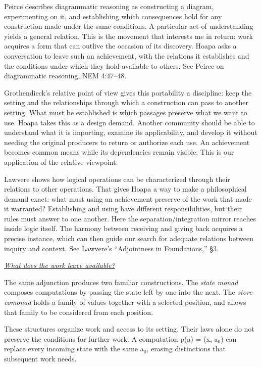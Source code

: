 \documentclass[a4paper,10pt]{article}
\newcommand{\subhead}[1]{\par\addvspace{4pt}\noindent\underline{\emph{#1}}\par\nopagebreak}
\newcommand{\marked}[1]{\par\addvspace{2pt}{\bfseries #1}\par\nopagebreak}
\renewenvironment{leftbar}{%
  \def\FrameCommand{{\color{black!30}\vrule width 1.2pt}\hspace{6pt}}%
  \MakeFramed{\advance\hsize-\width \FrameRestore}}{\endMakeFramed}
\newenvironment{commentary}{\par\vspace{-2pt}\begin{leftbar}\color{black!80}}{\end{leftbar}}
\begin{document}
\begin{commentary}
\marked{\textcolor{returnroyal}{Return}}
Peirce describes diagrammatic reasoning as constructing a diagram, experimenting on it, and establishing which consequences hold for any construction made under the same conditions. A particular act of understanding yields a general relation. This is the movement that interests me in return: work acquires a form that can outlive the occasion of its discovery. Hoapa asks a conversation to leave such an achievement, with the relations it establishes and the conditions under which they hold available to others. See Peirce on diagrammatic reasoning, NEM 4:47–48.\par
\marked{\textcolor{replayolive}{Replay}}
Grothendieck's relative point of view gives this portability a discipline: keep the setting and the relationships through which a construction can pass to another setting. What must be established is which passages preserve what we want to use. Hoapa takes this as a design demand. Another community should be able to understand what it is importing, examine its applicability, and develop it without needing the original producers to return or authorize each use. An achievement becomes common means while its dependencies remain visible. This is our application of the relative viewpoint.\par
\marked{\textcolor{harmonyorchid}{Harmony}}
Lawvere shows how logical operations can be characterized through their relations to other operations. That gives Hoapa a way to make a philosophical demand exact: what must using an achievement preserve of the work that made it warranted? Establishing and using have different responsibilities, but their rules must answer to one another. Here the separation/integration mirror reaches inside logic itself. The harmony between receiving and giving back acquires a precise instance, which can then guide our search for adequate relations between inquiry and context. See Lawvere's “Adjointness in Foundations,” §3.\par
\end{commentary}
\subhead{What does the work leave available?}
The same adjunction produces two familiar constructions. The \textcolor{statemonadcerulean}{\emph{state monad}} composes computations by passing the state left by one into the next. The \textcolor{storecomonadtangerine}{\emph{store comonad}} holds a family of values together with a selected position, and allows that family to be considered from each position.\par
These structures organize work and access to its setting. Their laws alone do not preserve the conditions for further work. A computation p(a) = (x, a\ensuremath{_0}) can replace every incoming state with the same a\ensuremath{_0}, erasing distinctions that subsequent work needs.\par
\end{document}
